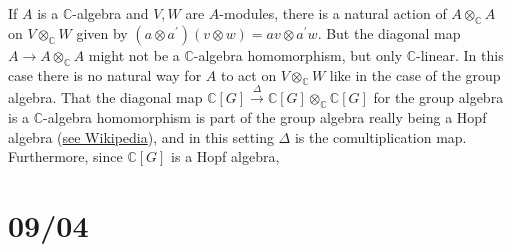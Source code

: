 \documentclass[11pt,leqno]{article}
\theoremstyle{plain}
\theoremstyle{definition}
\numberwithin{equation}{section}
\numberwithin{lem}{section}
\begin{document}
If $A$ is a $\mathbb C$-algebra and $V,W$ are $A$-modules, there is a natural action of $A\otimes_\mathbb CA$ on $V\otimes_{\mathbb C}W$ given by $(a\otimes a^\prime)(v\otimes w) = av\otimes a^\prime w$. But the diagonal map $A\to A\otimes_{\mathbb C}A$ might not be a $\mathbb C$-algebra homomorphism, but only $\mathbb C$-linear. In this case there is no natural way for $A$ to act on $V\otimes_{\mathbb C}W$ like in the case of the group algebra. That the diagonal map $\mathbb C[G]\xrightarrow{\Delta}\mathbb C[G]\otimes_{\mathbb C} \mathbb C[G]$ for the group algebra is a $\mathbb C$-algebra homomorphism is part of the group algebra really being a Hopf algebra (\href{https://en.wikipedia.org/wiki/Hopf_algebra}{see Wikipedia}), and in this setting $\Delta$ is the comultiplication map. Furthermore, since $\mathbb C[G]$ is a Hopf algebra, 


\newpage\section{09/04}


\newpage
\begin{bibdiv}
\begin{biblist}




\end{biblist}
\end{bibdiv}
\end{document}
